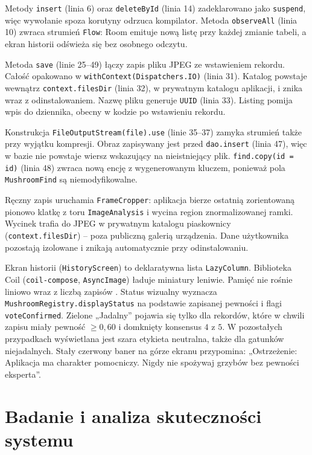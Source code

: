 Metody \texttt{insert} (linia 6) oraz \texttt{deleteById} (linia 14) zadeklarowano jako \texttt{suspend}, więc wywołanie spoza korutyny odrzuca kompilator. Metoda \texttt{observeAll} (linia 10) zwraca strumień \texttt{Flow}: Room emituje nową listę przy każdej zmianie tabeli, a ekran historii odświeża się bez osobnego odczytu.

Metoda \texttt{save} (linie 25--49) łączy zapis pliku JPEG ze wstawieniem rekordu. Całość opakowano w \texttt{withContext(Dispatchers.IO)} (linia 31). Katalog powstaje wewnątrz \texttt{context.filesDir} (linia 32), w prywatnym katalogu aplikacji, i znika wraz z odinstalowaniem. Nazwę pliku generuje \texttt{UUID} (linia 33). Listing pomija wpis do dziennika, obecny w kodzie po wstawieniu rekordu.

Konstrukcja \texttt{FileOutputStream(file).use} (linie 35--37) zamyka strumień także przy wyjątku kompresji. Obraz zapisywany jest przed \texttt{dao.insert} (linia 47), więc w bazie nie powstaje wiersz wskazujący na nieistniejący plik. \texttt{find.copy(id = id)} (linia 48) zwraca nową encję z wygenerowanym kluczem, ponieważ pola \texttt{MushroomFind} są niemodyfikowalne.

Ręczny zapis uruchamia \texttt{FrameCropper}: aplikacja bierze ostatnią zorientowaną pionowo klatkę z toru \texttt{ImageAnalysis} i wycina region znormalizowanej ramki. Wycinek trafia do JPEG w prywatnym katalogu piaskownicy (\texttt{context.filesDir}) – poza publiczną galerią urządzenia. Dane użytkownika pozostają izolowane i znikają automatycznie przy odinstalowaniu.

Ekran historii (\texttt{HistoryScreen}) to deklaratywna lista \texttt{LazyColumn}. Biblioteka Coil (\texttt{coil-compose}, \texttt{AsyncImage}) ładuje miniatury leniwie. Pamięć nie rośnie liniowo wraz z liczbą zapisów \cite{coil}. Status wizualny wyznacza \texttt{MushroomRegistry.displayStatus} na podstawie zapisanej pewności i flagi \texttt{voteConfirmed}. Zielone „Jadalny” pojawia się tylko dla rekordów, które w chwili zapisu miały pewność $\ge 0{,}60$ i domknięty konsensus $4$ z $5$. W pozostałych przypadkach wyświetlana jest szara etykieta neutralna, także dla gatunków niejadalnych. Stały czerwony baner na górze ekranu przypomina: „Ostrzeżenie: Aplikacja ma charakter pomocniczy. Nigdy nie spożywaj grzybów bez pewności eksperta”.

\chapter{Badanie i analiza skuteczności systemu}\label{chap:badania}

